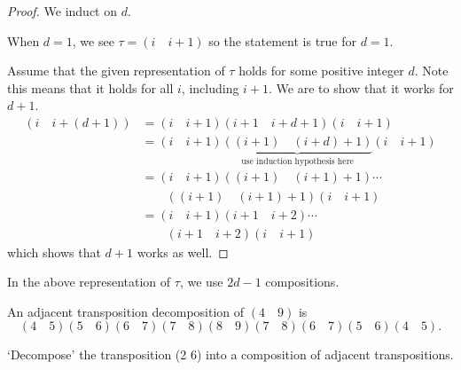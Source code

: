 \begin{proof}
    We induct on $d$.

    When $d = 1$, we see $\tau = (i\quad i+1)$ so the statement is true for $d=1$.

    Assume that the given representation of $\tau$ holds for some positive integer $d$. Note this means that it holds for all $i$, including $i+1$. We are to show that it works for $d + 1$.
    \begin{align*}
        (i\quad i+(d+1)) &= (i\quad i+1)(i+1\quad i+d+1)(i\quad i+1)\\
        &= (i\quad i+1)\underbrace{((i+1)\quad (i+d)+1)}_{\text{use induction hypothesis here}}(i\quad i+1)\\
        &= (i\quad i+1)((i+1)\quad(i+1)+1)\cdots\\
        &\quad\quad((i+1)\quad(i+1)+1)(i\quad i+1)\\
        &= (i\quad i+1)(i+1\quad i+2)\cdots\\
        &\quad\quad(i+1\quad i+2)(i\quad i+1)
    \end{align*}
    which shows that $d+1$ works as well.
\end{proof}
\begin{remark}
    In the above representation of $\tau$, we use $2d-1$ compositions.
\end{remark}
\begin{example}
    An adjacent transposition decomposition of $(4\quad9)$ is
    \[
        (4\quad 5)(5\quad 6)(6\quad 7)(7\quad 8)(8\quad 9)(7\quad 8)(6\quad 7)(5\quad 6)(4\quad 5).
    \]
\end{example}
\begin{exercise}
    `Decompose' the transposition (2 6) into a composition of adjacent transpositions.
\end{exercise}

